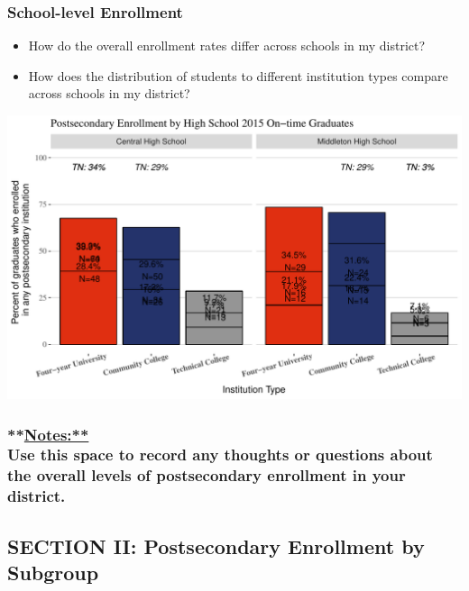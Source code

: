 \documentclass[11pt,]{article}
\providecommand{\tightlist}{%
  \setlength{\itemsep}{0pt}\setlength{\parskip}{0pt}}
\begin{document}
\newpage

\subsubsection{School-level Enrollment}\label{school-level-enrollment}

\begin{itemize}
\tightlist
\item
  How do the overall enrollment rates differ across schools in my
  district?
\item
  How does the distribution of students to different institution types
  compare across schools in my district?
\end{itemize}

\includegraphics{20170511_PSWRR_files/figure-latex/Enrollment by School-1.pdf}

\subsubsection{\texorpdfstring{**\url{Notes:**}\\
Use this space to record any thoughts or questions about the overall
levels of postsecondary enrollment in your
district.}{**Notes:** Use this space to record any thoughts or questions about the overall levels of postsecondary enrollment in your district.}}\label{notes-use-this-space-to-record-any-thoughts-or-questions-about-the-overall-levels-of-postsecondary-enrollment-in-your-district.}

\newpage 

\subsection{SECTION II: Postsecondary Enrollment by
Subgroup}\label{section-ii-postsecondary-enrollment-by-subgroup}
\end{document}
